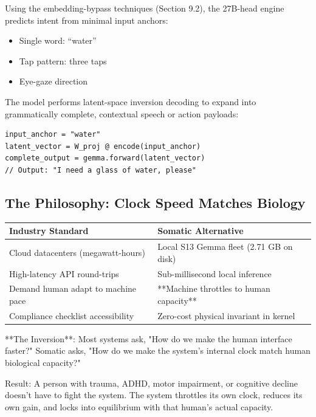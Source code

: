 \documentclass[11pt,oneside]{article}
\theoremstyle{definition}
\begin{document}
Using the embedding-bypass techniques (Section 9.2), the 27B-head engine predicts intent from minimal input anchors:

\begin{itemize}
  \item Single word: ``water''
  \item Tap pattern: three taps
  \item Eye-gaze direction
\end{itemize}

The model performs latent-space inversion decoding to expand into grammatically complete, contextual speech or action payloads:

\begin{lstlisting}
input_anchor = "water"
latent_vector = W_proj @ encode(input_anchor)
complete_output = gemma.forward(latent_vector)
// Output: "I need a glass of water, please"
\end{lstlisting}

\subsection{The Philosophy: Clock Speed Matches Biology}

\begin{center}
\begin{tabular}{ll}
\toprule
\textbf{Industry Standard} & \textbf{Somatic Alternative} \\
\midrule
Cloud datacenters (megawatt-hours) & Local S13 Gemma fleet (2.71 GB on disk) \\
High-latency API round-trips & Sub-millisecond local inference \\
Demand human adapt to machine pace & **Machine throttles to human capacity** \\
Compliance checklist accessibility & Zero-cost physical invariant in kernel \\
\toprule
\end{tabular}
\end{center}

**The Inversion**: Most systems ask, "How do we make the human interface faster?" Somatic asks, "How do we make the system's internal clock match human biological capacity?"

Result: A person with trauma, ADHD, motor impairment, or cognitive decline doesn't have to fight the system. The system throttles its own clock, reduces its own gain, and locks into equilibrium with that human's actual capacity.
\end{document}
